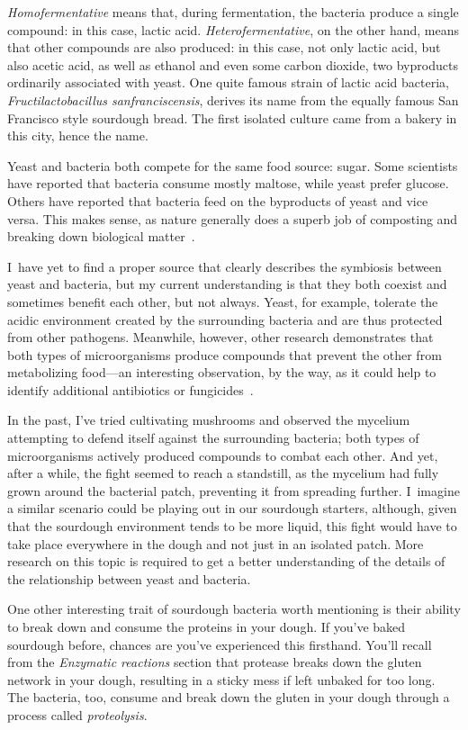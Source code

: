 \emph{Homofermentative} means that, during fermentation, the bacteria produce
a single compound: in this case, lactic acid. \emph{Heterofermentative}, on
the other hand, means that other compounds are also produced: in this case,
not only lactic acid, but also acetic acid, as well as ethanol and even some
carbon dioxide, two byproducts ordinarily associated with yeast. One quite
famous strain of lactic acid bacteria, \emph{Fructilactobacillus sanfranciscensis},
derives its name from the equally famous San Francisco style sourdough bread.
The first isolated culture came from a bakery in this city, hence the name.

Yeast and bacteria both compete for the same food source: sugar. Some scientists
have reported that bacteria consume mostly maltose, while yeast prefer glucose.
Others have reported that bacteria feed on the byproducts of yeast and vice
versa. This makes sense, as nature generally does a superb job of composting
and breaking down biological matter~\cite{lactobacillus+sanfrancisco}.

I~have yet to find a proper source that clearly describes the symbiosis between
yeast and bacteria, but my current understanding is that they both coexist and
sometimes benefit each other, but not always. Yeast, for example, tolerate the
acidic environment created by the surrounding bacteria and are thus protected
from other pathogens. Meanwhile, however, other research demonstrates that both
types of microorganisms produce compounds that prevent the other from
metabolizing food---an interesting observation, by the way, as it could help to
identify additional antibiotics or fungicides~\cite{mold+lactic+acid+bacteria}.

In the past, I've tried cultivating mushrooms and observed the mycelium
attempting to defend itself against the surrounding bacteria; both types of
microorganisms actively produced compounds to combat each other. And yet,
after a while, the fight seemed to reach a standstill, as the mycelium had
fully grown around the bacterial patch, preventing it from spreading further.
I~imagine a similar scenario could be playing out in our sourdough starters,
although, given that the sourdough environment tends to be more liquid, this
fight would have to take place everywhere in the dough and not just in an
isolated patch. More research on this topic is required to get a better understanding of
the details of the relationship between yeast and bacteria.


One other interesting trait of sourdough bacteria worth mentioning is their
ability to break down and consume the proteins in your dough. If you've baked
sourdough before, chances are you've experienced this firsthand. You'll recall
from the \emph{Enzymatic reactions} section that protease breaks down the
gluten network in your dough, resulting in a sticky mess if left unbaked for
too long. The bacteria, too, consume and break down the gluten in your
dough through a process called \emph{proteolysis}.

